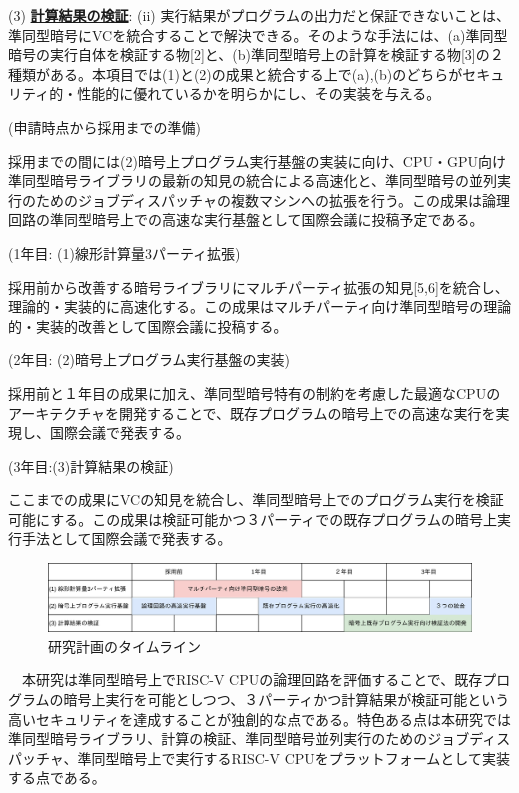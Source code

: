 \noindent(3)  \underline{\textbf{計算結果の検証}}: (ii) 実行結果がプログラムの出力だと保証できないことは、準同型暗号にVCを統合することで解決できる。そのような手法には、(a)準同型暗号の実行自体を検証する物[2]と、(b)準同型暗号上の計算を検証する物[3]の２種類がある。本項目では(1)と(2)の成果と統合する上で(a),(b)のどちらがセキュリティ的・性能的に優れているかを明らかにし、その実装を与える。


\noindent(申請時点から採用までの準備)

採用までの間には(2)暗号上プログラム実行基盤の実装に向け、CPU・GPU向け準同型暗号ライブラリの最新の知見の統合による高速化と、準同型暗号の並列実行のためのジョブディスパッチャの複数マシンへの拡張を行う。この成果は論理回路の準同型暗号上での高速な実行基盤として国際会議に投稿予定である。

\noindent(1年目: (1)線形計算量3パーティ拡張)

採用前から改善する暗号ライブラリにマルチパーティ拡張の知見[5,6]を統合し、理論的・実装的に高速化する。この成果はマルチパーティ向け準同型暗号の理論的・実装的改善として国際会議に投稿する。

\noindent(2年目: (2)暗号上プログラム実行基盤の実装)

採用前と１年目の成果に加え、準同型暗号特有の制約を考慮した最適なCPUのアーキテクチャを開発することで、既存プログラムの暗号上での高速な実行を実現し、国際会議で発表する。

\noindent(3年目:(3)計算結果の検証)

ここまでの成果にVCの知見を統合し、準同型暗号上でのプログラム実行を検証可能にする。この成果は検証可能かつ３パーティでの既存プログラムの暗号上実行手法として国際会議で発表する。

\begin{figure}[h]
    \centering
    \includegraphics[width=\linewidth]{figures/schedule.drawio.png}
    \vspace*{-1cm}
    \caption{研究計画のタイムライン}
    \label{fig:schedule}
\end{figure}


　本研究は準同型暗号上でRISC-V CPUの論理回路を評価することで、既存プログラムの暗号上実行を可能としつつ、３パーティかつ計算結果が検証可能という高いセキュリティを達成することが独創的な点である。特色ある点は本研究では準同型暗号ライブラリ、計算の検証、準同型暗号並列実行のためのジョブディスパッチャ、準同型暗号上で実行するRISC-V CPUをプラットフォームとして実装する点である。


